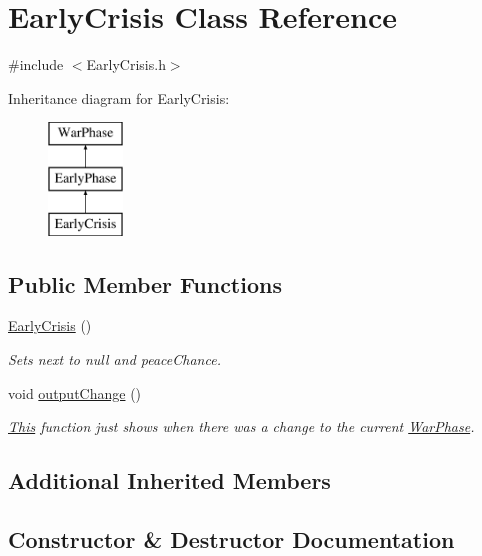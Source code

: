 \hypertarget{class_early_crisis}{}\section{Early\+Crisis Class Reference}
\label{class_early_crisis}


{\ttfamily \#include $<$Early\+Crisis.\+h$>$}

Inheritance diagram for Early\+Crisis\+:\begin{figure}[H]
\begin{center}
\leavevmode
\includegraphics[height=3.000000cm]{class_early_crisis}
\end{center}
\end{figure}
\subsection*{Public Member Functions}
\begin{DoxyCompactItemize}
\item 
\mbox{\hyperlink{class_early_crisis_a7d6c4f2a0563d13f89ef739b7b7691a2}{Early\+Crisis}} ()
\begin{DoxyCompactList}\small\item\em Sets next to null and peace\+Chance. \end{DoxyCompactList}\item 
void \mbox{\hyperlink{class_early_crisis_af25e06788b565ba54a431175ab4c3c53}{output\+Change}} ()
\begin{DoxyCompactList}\small\item\em \mbox{\hyperlink{class_this}{This}} function just shows when there was a change to the current \mbox{\hyperlink{class_war_phase}{War\+Phase}}. \end{DoxyCompactList}\end{DoxyCompactItemize}
\subsection*{Additional Inherited Members}


\subsection{Constructor \& Destructor Documentation}
\mbox{\label{class_early_crisis_a7d6c4f2a0563d13f89ef739b7b7691a2}} 
